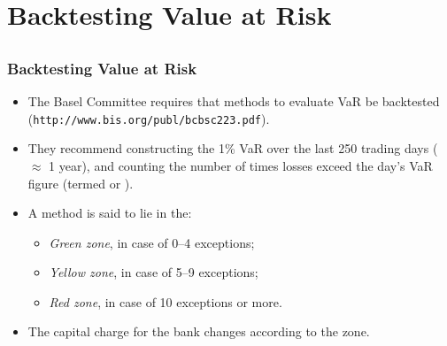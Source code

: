 \section[Backtesting]{Backtesting Value at Risk}\subsection*{}

\begin{frame}%

\frametitle{Backtesting Value at Risk}

\begin{itemize}
\item The Basel Committee requires that methods to evaluate VaR be
backtested (\texttt{http://www.bis.org/publ/bcbsc223.pdf}).

\item They recommend constructing the 1\% VaR over the last 250 trading days
($\approx $ 1 year), and counting the number of times losses exceed the
day's VaR figure (termed  or  ).

\item A method is said to lie in the:

\begin{itemize}
\item \emph{\color{green}Green zone}, in case of 0--4 exceptions;

\item \emph{\color{orange}Yellow zone}, in case of 5--9 exceptions;

\item \emph{\color{red}Red zone}, in case of 10 exceptions or more.
\end{itemize}
\item The capital charge for the bank changes according to the zone.
\end{itemize}

\end{frame}%

